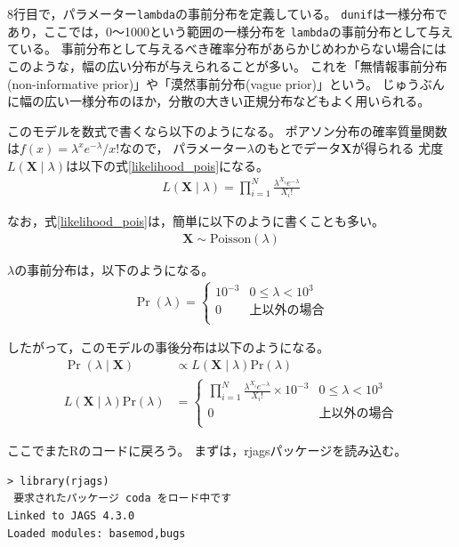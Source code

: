 \documentclass[11pt,uplatex]{jsarticle}
\begin{document}
8行目で，パラメーター\texttt{lambda}の事前分布を定義している。
\texttt{dunif}は一様分布であり，ここでは，0〜1000という範囲の一様分布を
\texttt{lambda}の事前分布として与えている。
事前分布として与えるべき確率分布があらかじめわからない場合には
このような，幅の広い分布が与えられることが多い。
これを「無情報事前分布(non-informative prior)」や「漠然事前分布(vague prior)」という。
じゅうぶんに幅の広い一様分布のほか，分散の大きい正規分布などもよく用いられる。

このモデルを数式で書くなら以下のようになる。
ポアソン分布の確率質量関数は$f(x)=\lambda^{x}e^{-\lambda}/x!$なので，
パラメーター$\lambda$のもとでデータ$\bm{X}$が得られる
尤度$L(\bm{X}  \mid  \lambda)$は以下の式\ref{likelihood_pois}になる。
\begin{align}
L(\bm{X} \mid \lambda) = \prod_{i = 1}^{N}\frac{\lambda^{X_{i}}e^{-\lambda}}{X_{i}!}
\label{likelihood_pois}
\end{align}

なお，式\ref{likelihood_pois}は，簡単に以下のように書くことも多い。
\begin{align*}
\bm{X} \sim \mathrm{Poisson}(\lambda)
\end{align*}

$\lambda$の事前分布は，以下のようになる。
\begin{align*}
\Pr(\lambda) = \begin{cases}
 10^{-3} & 0 \leq \lambda  < 10^{3}  \\
 0 & 上以外の場合 \\
\end{cases}
\end{align*}


したがって，このモデルの事後分布は以下のようになる。
\begin{align*}
\Pr(\lambda \mid \bm{X}) &\propto L(\bm{X} \mid \lambda) \mathrm{Pr}(\lambda) \\
L(\bm{X} \mid \lambda) \mathrm{Pr}(\lambda) &=\begin{cases}
 \prod_{i = 1}^{N}\frac{\lambda^{X_{i}}e^{-\lambda}}{X_{i}!} \times 10^{-3} & 0 \leq \lambda  < 10^{3}  \\
 0 & 上以外の場合  \label{posterior} \\
\end{cases}
\end{align*}

\vspace{1zw}

ここでまた\textsf{R}のコードに戻ろう。
まずは，\textsf{rjags}パッケージを読み込む。
\begin{lstlisting}
> library(rjags)
 要求されたパッケージ coda をロード中です 
Linked to JAGS 4.3.0
Loaded modules: basemod,bugs
\end{lstlisting}
\end{document}
